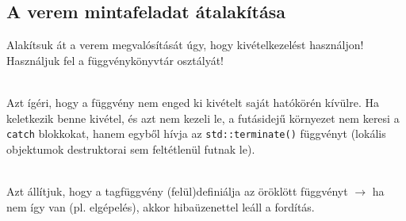 \documentclass[usenames,dvipsnames,aspectratio=169]{beamer}
\begin{document}
\subsection{A verem mintafeladat átalakítása}

\begin{frame}
    Alakítsuk át a verem megvalósítását úgy, hogy kivételkezelést használjon! Használjuk fel a függvénykönyvtár  osztályát!
    \begin{exampleblock}{}
        \small
        
    \end{exampleblock}
\end{frame}

\begin{frame}
    \begin{exampleblock}{}
        \small
        
    \end{exampleblock}
\end{frame}

\begin{frame}
    \begin{description}[m]
        \item[\hiv{\href{https://en.cppreference.com/cpp/language/noexcept_spec}{\texttt{noexcept}}}] \hfill \\ Azt ígéri, hogy a függvény nem enged ki kivételt saját hatókörén kívülre. Ha keletkezik benne kivétel, és azt nem kezeli le, a futásidejű környezet nem keresi a \texttt{catch} blokkokat, hanem egyből hívja az \texttt{std::terminate()} függvényt (lokális objektumok destruktorai sem feltétlenül futnak le).
        \item[\hiv{\href{https://en.cppreference.com/w/cpp/language/override}{\texttt{override}}}] \hfill \\ Azt állítjuk, hogy a tagfüggvény (felül)definiálja az öröklött függvényt $\to$ ha nem így van (pl. elgépelés), akkor hibaüzenettel leáll a fordítás.
    \end{description}
\end{frame}

\begin{frame}
    \begin{exampleblock}{}
        \vspace{-.2cm}
        
        
        
        
        \vspace{-.2cm}
    \end{exampleblock}
\end{frame}
\end{document}
